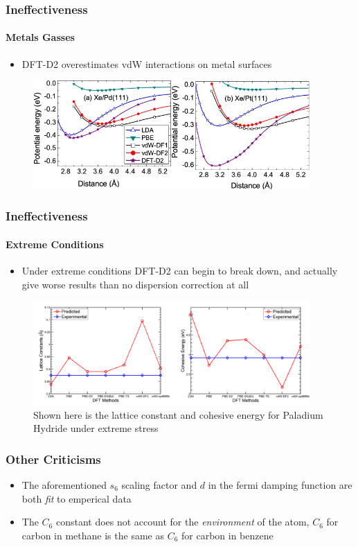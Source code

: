 \documentclass[12pt]{beamer}
\begin{document}
\begin{frame}
  \frametitle{Ineffectiveness}
  \framesubtitle{Metals Gasses}
  \begin{itemize}
    \item \small{DFT-D2 overestimates vdW interactions on metal surfaces \footnotemark }
  \end{itemize}
  \begin{figure}
    \includegraphics[width=300pt]{chen.jpg}
  \end{figure}
\end{frame}

\begin{frame}
  \frametitle{Ineffectiveness}
  \framesubtitle{Extreme Conditions}
  \begin{itemize}
    \item Under extreme conditions DFT-D2 can begin to break down, and actually give worse results than no dispersion correction at all\footnotemark
  \end{itemize}
  \captionsetup[figure]{font=tiny}
  \begin{figure}
    \includegraphics[width=300pt]{palladium.jpg}
    \caption{Shown here is the lattice constant and cohesive energy for Paladium Hydride under extreme stress}
  \end{figure}
\end{frame}

\begin{frame}
  \frametitle{Other Criticisms}
  \begin{itemize}
    \item The aforementioned $s_6$ scaling factor and $d$ in the fermi damping function are both \emph{fit} to emperical data
    \item The $C_6$ constant does not account for the \emph{environment} of the atom, $C_6$ for carbon in methane is the same as $C_6$ for carbon in benzene
  \end{itemize}
\end{frame}
\end{document}
